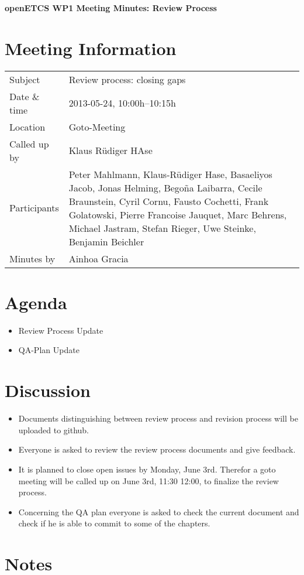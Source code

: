 \documentclass[a4paper, 11pt]{article}
\begin{document}
{\begin{center}\huge\bf openETCS WP1 Meeting Minutes: Review Process\end{center}}
\section{Meeting Information}

\renewcommand{\arraystretch}{1.5}
\begin{supertabular}{m{.2\textwidth}m{.8\textwidth}}
Subject & Review process: closing gaps\\
Date \& time & 2013-05-24, 10:00h--10:15h\\
Location & Goto-Meeting\\
Called up by & Klaus R\"udiger HAse\\
Participants & 
Peter Mahlmann,
Klaus-R\"udiger Hase,
Basaeliyos Jacob,
Jonas Helming,
Bego\~na Laibarra,
Cecile Braunstein,
Cyril Cornu,
Fausto Cochetti,
Frank Golatowski,
Pierre Francoise Jauquet,
Marc Behrens,
Michael Jastram,
Stefan Rieger,
Uwe Steinke,
Benjamin Beichler
\\

Minutes by & Ainhoa Gracia\\

\end{supertabular}
\renewcommand{\arraystretch}{1.0}


\section{{Agenda}}
\begin{itemize}
\item Review Process Update
\item QA-Plan Update
\end{itemize}

\section{Discussion}
\begin{itemize}
\item Documents distinguishing between review process and revision process will be uploaded to github.
\item Everyone is asked to review the review process documents and give feedback.
\item It is planned to close open issues by Monday, June 3rd. Therefor a goto meeting will be called up on June 3rd, 11:30 12:00, to finalize the review process.
\item Concerning the QA plan everyone is asked to check the current document and check if he is able to commit to some of the chapters.

\end{itemize}

\section{Notes}
\end{document}
